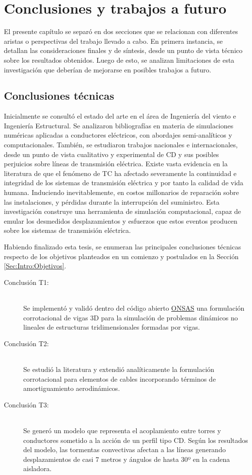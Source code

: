 \chapter{Conclusiones y trabajos a futuro}\label{Cap:Conlcusiones}

El presente capítulo se separó en dos secciones que se relacionan con diferentes aristas o perspectivas del trabajo llevado a cabo. En primera instancia, se detallan las consideraciones finales y de síntesis, desde un punto de vista técnico sobre los resultados obtenidos. Luego de esto, se analizan limitaciones de esta investigación que deberían de mejorarse en posibles trabajos a futuro.    

\section{Conclusiones técnicas}
Inicialmente se consultó el estado del arte en el área de Ingeniería del viento e Ingeniería Estructural. Se analizaron bibliografías en materia de simulaciones numéricas aplicadas a conductores eléctricos, con abordajes semi-analíticos y computacionales. También, se estudiaron trabajos nacionales e internacionales, desde un punto de vista cualitativo y experimental de CD y sus posibles perjuicios sobre líneas de transmisión eléctrica. Existe vasta evidencia en la literatura de que el fenómeno de \gls{TC} ha afectado severamente la continuidad e integridad de los sistemas de transmisión eléctrica y por tanto la calidad de vida humana. Induciendo inevitablemente, en costos millonarios de reparación sobre las instalaciones, y pérdidas durante la interrupción del suministro. Esta investigación construye una herramienta de simulación computacional, capaz de emular los desmedidos desplazamientos y esfuerzos que estos eventos producen sobre los sistemas de transmisión eléctrica. 

Habiendo finalizado esta tesis, se enumeran las principales conclusiones técnicas respecto de los objetivos planteados en un comienzo y postulados en la Sección \ref{Sec:Intro:Objetivos}.


\begin{description}
	\item[Conclusión T1:] \hfill \\ Se implementó y validó dentro del código abierto \href{https://github.com/ONSAS/ONSAS.m/}{ONSAS} una formulación corrotacional de vigas 3D para la simulación de problemas dinámicos no lineales de estructuras tridimensionales formadas por vigas.
	\item[Conclusión T2:] \hfill \\ Se estudió la literatura y extendió analíticamente la formulación corrotacional para elementos de cables incorporando términos de amortiguamiento aerodinámicos.
	\item[Conclusión T3:] \hfill \\ Se generó un modelo que representa el acoplamiento entre torres y conductores sometido a la acción de un perfil tipo CD. Según los resultados del modelo, las tormentas convectivas afectan a las líneas generando desplazamientos de casi 7 metros y ángulos de hasta 30º en la cadena aisladora. 
\end{description}

